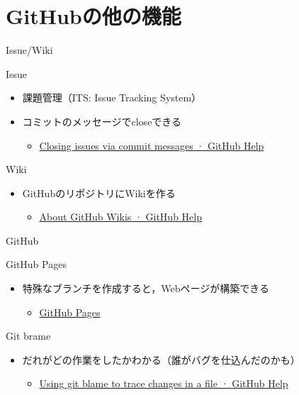 \documentclass[t, aspectratio=169]{beamer}
\begin{document}
\section{GitHubの他の機能}
\label{sec-4-3}
\begin{frame}[label=sec-4-3-1]{Issue/Wiki}
\begin{block}{Issue}
\begin{itemize}
\item 課題管理（ITS: Issue Tracking System）
\item コミットのメッセージでcloseできる
\begin{itemize}
\item \href{https://help.github.com/articles/closing-issues-via-commit-messages}{Closing issues via commit messages · GitHub Help}
\end{itemize}
\end{itemize}
\end{block}
\begin{block}{Wiki}
\begin{itemize}
\item GitHubのリポジトリにWikiを作る
\begin{itemize}
\item \href{https://help.github.com/articles/about-github-wikis}{About GitHub Wikis · GitHub Help}
\end{itemize}
\end{itemize}
\end{block}
\end{frame}
\begin{frame}[label=sec-4-3-2]{GitHub}
\begin{block}{GitHub Pages}
\begin{itemize}
\item 特殊なブランチを作成すると，Webページが構築できる
\begin{itemize}
\item \href{https://pages.github.com/}{GitHub Pages}
\end{itemize}
\end{itemize}
\end{block}
\begin{block}{Git brame}
\begin{itemize}
\item だれがどの作業をしたかわかる（誰がバグを仕込んだのかも）
\begin{itemize}
\item \href{https://help.github.com/articles/using-git-blame-to-trace-changes-in-a-file}{Using git blame to trace changes in a file · GitHub Help}
\end{itemize}
\end{itemize}
\end{block}
\end{frame}
\end{document}
